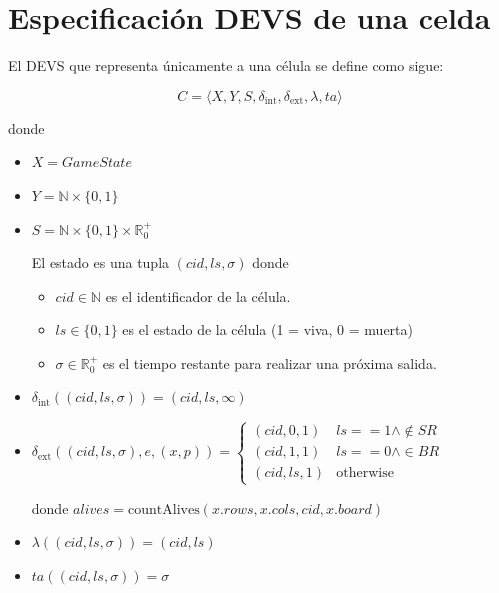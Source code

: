 \documentclass[]{article}
\newcommand{\dint}{\delta_{\text{int}}}
\newcommand{\dext}{\delta_{\text{ext}}}
\newcommand{\estado}{(cid,ls,\sigma)}
\newcommand{\R}{\mathbb{R}}
\newcommand{\N}{\mathbb{N}}
\begin{document}
\section{Especificación DEVS de una celda}

El DEVS que representa únicamente a una célula se define como sigue:

\[ C = \langle X, Y, S, \dint, \dext, \lambda, ta \rangle \]

donde

\begin{itemize}
  \item $X = GameState $

  \item $Y = \N \times \{0,1\}$

  \item $S = \N \times \{0, 1\} \times   \R_0^+$

    El estado es una tupla $(cid, ls, \sigma)$ donde

    \begin{itemize}
      \item $cid \in \N$ es el identificador de la célula.
      \item $ls \in \{0, 1\}$ es el estado de la célula (1 = viva, 0 = muerta)
      \item $\sigma \in \R_0^+$ es el tiempo restante para realizar una próxima salida.
    \end{itemize}

  \item $\dint(\estado) = (cid,ls,\infty)$


  \item $\dext(\estado, e, (x, p)) = \begin{cases}
    (cid,0,1) & ls == 1 \land \not \in SR  \\
    (cid,1,1) & ls == 0 \land \in BR \\
    (cid,ls,1) & \text{otherwise }
  \end{cases}$

    donde $alives = \text{countAlives}(x.rows,x.cols,cid,x.board)$
  \item $\lambda(\estado) = (cid,ls) $
  \item $ta(\estado) = \sigma$

\end{itemize}
\end{document}
